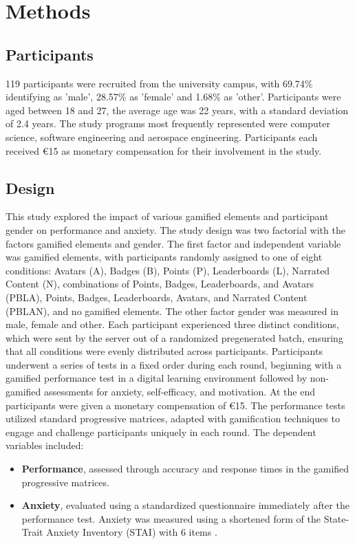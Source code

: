 \section{Methods}
\subsection{Participants}
119 participants were recruited from the university campus, with 69.74\% identifying as 'male', 28.57\% as 'female' and 1.68\% as 'other'.
Participants were aged between 18 and 27, the average age was 22 years, with a standard deviation of 2.4 years.
The study programs most frequently represented were computer science, software engineering and aerospace engineering.
Participants each received €15 as monetary compensation for their involvement in the study.

\subsection{Design}
This study explored the impact of various gamified elements and participant gender on performance and anxiety.
The study design was two factorial with the factors gamified elements and gender.
The first factor and independent variable was gamified elements, with participants randomly assigned to one of eight conditions:
Avatars (A), Badges (B), Points (P), Leaderboards (L), Narrated Content (N), combinations of Points, Badges, Leaderboards, and Avatars (PBLA), Points, Badges, Leaderboards, Avatars, and Narrated Content (PBLAN), and no gamified elements.
The other factor gender was measured in male, female and other.
Each participant experienced three distinct conditions, which were sent by the server out of a randomized pregenerated batch, ensuring that all conditions were evenly distributed across participants.
Participants underwent a series of tests in a fixed order during each round, beginning with a gamified performance test in a digital learning environment followed by non-gamified assessments for anxiety, self-efficacy, and motivation.
At the end participants were given a monetary compensation of €15.
The performance tests utilized standard progressive matrices, adapted with gamification techniques to engage and challenge participants uniquely in each round.
The dependent variables included:
\begin{itemize}
  \item \textbf{Performance}, assessed through accuracy and response times in the gamified progressive matrices.
  \item \textbf{Anxiety}, evaluated using a standardized questionnaire immediately after the performance test. Anxiety was measured using a shortened form of the State-Trait Anxiety Inventory (STAI) with 6 items \parencite{marteauDevelopmentSixitemShortform1992}.
\end{itemize}

